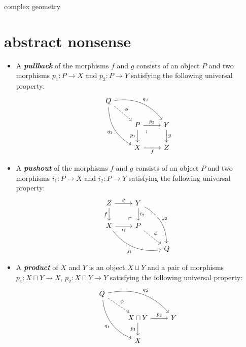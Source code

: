 

\makeatletter%
\newcommand{\extp}{\@ifnextchar^\@extp{\@extp^{\,}}}
\def\@extp^#1{\mathop{\bigwedge\nolimits^{\!#1}}}
\makeatother

\usepackage[style=authortitle-terse,backend=bibtex]{biblatex}



{\Huge complex geometry}
\tableofcontents

\section{abstract nonsense}
\begin{defn}\leavevmode
	\begin{itemize}
		\item A \textbf{\textit{pullback}} of the morphisms $f$ and $g$ consists of an object $P$ and two morphisms $p_1:P\to X$ and $p_2:P\to Y$ satisfying the following universal property:
		\[\begin{tikzcd}
			Q\arrow[rrd,bend left,"q_2"]\arrow[ddr,"q_1",swap,bend right]\arrow[dr,dashed,"\phi"]\\
			&P\arrow[r,"p_2"] \arrow[rd, phantom, "\lrcorner", very near start]\arrow[d,"p_1",swap]&Y\arrow[d,"g"]\\
			&X\arrow[r,"f",swap]&Z
		\end{tikzcd}\]
		\item A \textbf{\textit{pushout}} of the morphisms $f$ and $g$ consists of an object $P$ and two morphisms $i_1:P\to X$ and $i_2:P\to Y$ satisfying the following universal property:
		\[\begin{tikzcd}
			Z\arrow[r,"g"]\arrow[d,swap,"f"]&Y\arrow[d,"i_2"]\arrow[ddr,bend left,"j_2"]\\
			X\arrow[r,"i_1",swap]\arrow[drr,bend right,swap,"j_1"]&P\arrow[ul, phantom, "\ulcorner", very near start]\arrow[dr,dashed,"\phi"]\\
			&&Q
		\end{tikzcd}\]
		\item A \textbf{\textit{product}} of $X$ and $Y$ is an object $X\sqcup Y$ and a pair of morphisms $p_1:X\sqcap Y\to X$, $p_2:X\sqcap Y\to Y$ satisfying the following universal property:
		\[\begin{tikzcd}
			Q\arrow[rrd,bend left,"q_2"]\arrow[ddr,"q_1",swap,bend right]\arrow[dr,dashed,"\phi"]\\
			&X\sqcap Y\arrow[r,"p_2"]\arrow[d,"p_1",swap]&Y\\
			&X

\end{tikzcd}\]
\end{itemize}
\end{defn}
